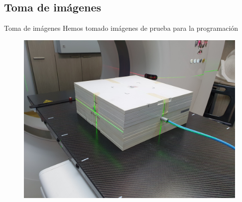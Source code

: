 \documentclass[12pt]{beamer}
\begin{document}
\subsection{Toma de imágenes}

\begin{frame}{Toma de imágenes}
Hemos tomado imágenes de prueba para la programación
\begin{figure}
	\centering
	\includegraphics[width=\linewidth]{images/20200826_153715.jpg}
\end{figure}
\end{frame}
\end{document}
